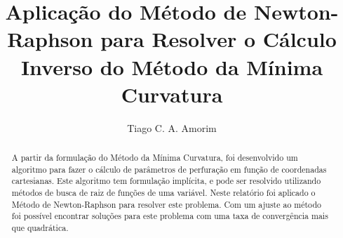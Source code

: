 \documentclass[final,5p]{elsarticle}
\numberwithin{equation}{section}
\begin{document}
\begin{frontmatter}



\title{Aplicação do Método de Newton-Raphson para Resolver o Cálculo Inverso do Método da Mínima Curvatura}


\author{Tiago C. A. Amorim}

\begin{abstract}

    A partir da formulação do Método da Mínima Curvatura, foi desenvolvido um algoritmo para fazer o cálculo de parâmetros de perfuração em função de coordenadas cartesianas. Este algoritmo tem formulação implícita, e pode ser resolvido utilizando métodos de busca de raiz de funções de uma variável. Neste relatório foi aplicado o Método de Newton-Raphson para resolver este problema. Com um ajuste ao método foi possível encontrar soluções para este problema com uma taxa de convergência mais que quadrática.


\end{abstract}
\end{frontmatter}
\end{document}
